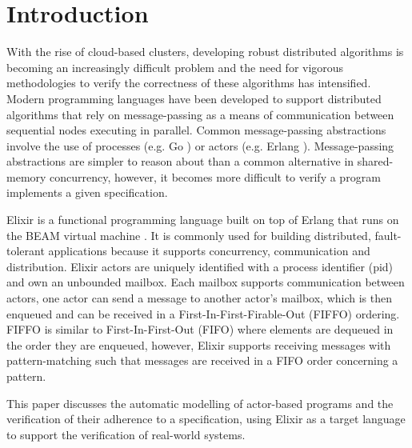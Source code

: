\chapter{Introduction}
With the rise of cloud-based clusters, developing robust distributed algorithms is becoming an increasingly difficult problem and the need for vigorous methodologies to verify the correctness of these algorithms has intensified. Modern programming languages have been developed to support distributed algorithms that rely on message-passing as a means of communication between sequential nodes executing in parallel. Common message-passing abstractions involve the use of processes (e.g. Go \cite{go}) or actors \cite{actor} (e.g. Erlang \cite{erlang}). Message-passing abstractions are simpler to reason about than a common alternative in shared-memory concurrency, however, it becomes more difficult to verify a program implements a given specification.
\par
Elixir \cite{elixir} is a functional programming language built on top of Erlang that runs on the BEAM virtual machine \cite{beam}. It is commonly used for building distributed, fault-tolerant applications because it supports concurrency, communication and distribution. Elixir actors are uniquely identified with a process identifier (pid) and own an unbounded mailbox. Each mailbox supports communication between actors, one actor can send a message to another actor's mailbox, which is then enqueued and can be received in a First-In-First-Firable-Out (FIFFO) ordering. FIFFO is similar to First-In-First-Out (FIFO) where elements are dequeued in the order they are enqueued, however, Elixir supports receiving messages with pattern-matching such that messages are received in a FIFO order concerning a pattern.
\par
This paper discusses the automatic modelling of actor-based programs and the verification of their adherence to a specification, using Elixir as a target language to support the verification of real-world systems.